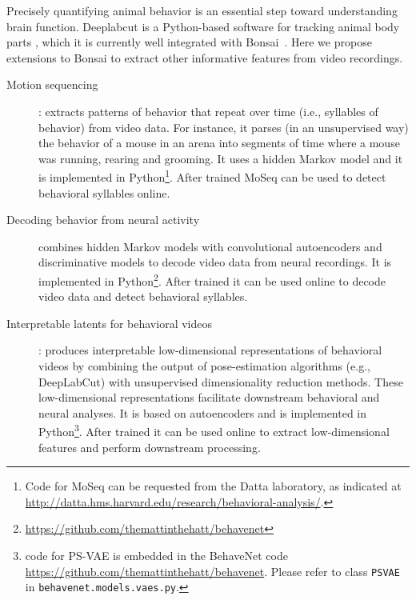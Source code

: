 \documentclass[a4paper,11point]{article}
\begin{document}
Precisely quantifying animal behavior is an essential step toward understanding
brain function.  Deeplabcut is a Python-based software for tracking animal body
parts \citep{mathisEtAl18}, which it is currently well integrated with
Bonsai~\citep{kaneEtAl20}. Here we propose extensions to Bonsai to extract
other informative features from video recordings.

\begin{description}

    \item[Motion sequencing]\citep[MoSeq;][]{wiltschkoEtAl15}: extracts patterns
        of behavior that repeat over time (i.e., syllables of behavior) from
        video data. For instance, it parses (in an unsupervised way) the
        behavior of a mouse in an arena into segments of time where a mouse
        was running, rearing and grooming. It uses a hidden Markov model and it
        is implemented in Python\footnote{Code for MoSeq can be requested from
        the Datta laboratory, as indicated at
        \href{http://datta.hms.harvard.edu/research/behavioral-analysis/}{http://datta.hms.harvard.edu/research/behavioral-analysis/}.}.
        After trained MoSeq can be used to detect behavioral syllables online.

    \item[Decoding behavior from neural
        activity]\citep[BehaveNet;][]{battyEtAl19} combines hidden Markov
        models with convolutional autoencoders and discriminative models to
        decode video data from neural recordings. It is implemented in
        Python\footnote{\href{https://github.com/themattinthehatt/behavenet}{https://github.com/themattinthehatt/behavenet}}.
        After trained it can be used online to decode video data and detect
        behavioral syllables.

    \item[Interpretable latents for behavioral videos]\citep[Partitioned
        Subspace Variational Autoencoder, PS-VAE;][]{whitewayEtAl21}: produces
        interpretable low-dimensional representations of behavioral videos by
        combining the output of pose-estimation algorithms (e.g., DeepLabCut)
        with unsupervised dimensionality reduction methods. These
        low-dimensional representations facilitate downstream behavioral and
        neural analyses. It is based on autoencoders and is implemented in
        Python\footnote{code for PS-VAE is embedded in the BehaveNet code
        \href{https://github.com/themattinthehatt/behavenet}{https://github.com/themattinthehatt/behavenet}.
        Please refer to class \texttt{PSVAE} in 
        \texttt{behavenet.models.vaes.py}.}. After trained it can be used
        online to extract low-dimensional features and perform downstream
        processing.

\end{description}
\end{document}
